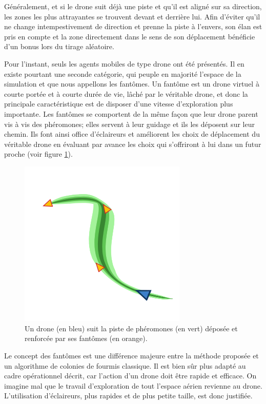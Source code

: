 \documentclass[12pt]{article}
\begin{document}
Généralement, et si le drone suit déjà une piste et qu'il est aligné
sur sa direction, les zones les plus attrayantes se trouvent devant et
derrière lui. Afin d'éviter qu'il ne change intempestivement de
direction et prenne la piste à l'envers, son élan est pris en compte
et la zone directement dans le sens de son déplacement bénéficie d'un
bonus lors du tirage aléatoire.

Pour l'instant, seuls les agents mobiles de type drone ont été
présentés. Il en existe pourtant une seconde catégorie, qui peuple en
majorité l'espace de la simulation et que nous appellons les
fantômes. Un fantôme est un drone virtuel à courte portée et à courte
durée de vie, lâché par le véritable drone, et donc la principale
caractéristique est de disposer d'une vitesse d'exploration plus
importante.  Les fantômes se comportent de la même façon que leur
drone parent vis à vis des phéromones; elles servent à leur guidage et
ils les déposent sur leur chemin. Ils font ainsi office d'éclaireurs
et améliorent les choix de déplacement du véritable drone en évaluant
par avance les choix qui s'offriront à lui dans un futur proche (voir
figure \ref{ghosts}).

\begin{figure}[H]
  \centering

  \includegraphics[width=8cm]{ghosts.png}

  \caption{Un drone (en bleu) suit la piste de phéromones (en vert)
    déposée et renforcée par ses fantômes (en orange).}
  \label{ghosts}
\end{figure}

Le concept des fantômes est une différence majeure entre la méthode
proposée et un algorithme de colonies de fourmis classique. Il est
bien sûr plus adapté au cadre opérationnel décrit, car l'action d'un
drone doit être rapide et efficace. On imagine mal que le travail
d'exploration de tout l'espace aérien revienne au drone. L'utilisation
d'éclaireurs, plus rapides et de plus petite taille, est donc
justifiée.
\end{document}
